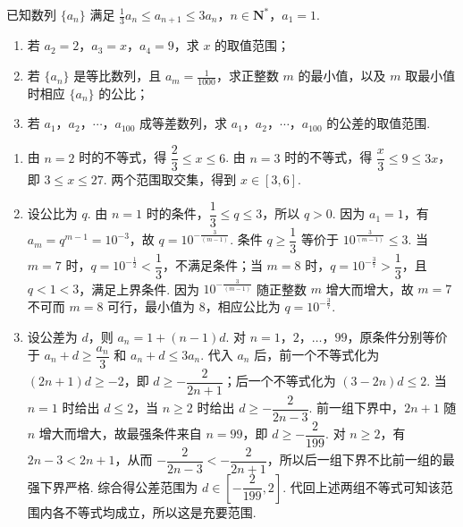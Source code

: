 \begin{problem}
已知数列 \(\{a_{n}\}\) 满足 \(\frac{1}{3} a_{n} \leqslant a_{n+1} \leqslant 3a_{n}\)，\(n \in \mathbf{N}^{*}\)，\(a_{1} = 1\).
\begin{enumerate}
\item 若 \(a_{2} = 2\)，\(a_{3} = x\)，\(a_{4} = 9\)，求 \(x\) 的取值范围；
\item 若 \(\{a_{n}\}\) 是等比数列，且 \(a_{m} = \frac{1}{1000}\)，求正整数 \(m\) 的最小值，以及 \(m\) 取最小值时相应 \(\{a_{n}\}\) 的公比；
\item 若 \(a_1\)，\(a_2\)，\(\cdots\)，\(a_{100}\) 成等差数列，求 \(a_1\)，\(a_2\)，\(\cdots\)，\(a_{100}\) 的公差的取值范围.
\end{enumerate}

\begin{solution}
\begin{enumerate}
\item 由 \(n=2\) 时的不等式，得 \(\dfrac23\leqslant x\leqslant6\). 由 \(n=3\) 时的不等式，得 \(\dfrac x3\leqslant9\leqslant3x\)，即 \(3\leqslant x\leqslant27\). 两个范围取交集，得到 \(x\in[3,6]\).
\item 设公比为 \(q\). 由 \(n=1\) 时的条件，\(\dfrac13\leqslant q\leqslant3\)，所以 \(q>0\). 因为 \(a_1=1\)，有 \(a_m=q^{m-1}=10^{-3}\)，故 \(q=10^{-\frac{3}{(m-1)}}\). 条件 \(q\geqslant\dfrac13\) 等价于 \(10^{\frac{3}{(m-1)}}\leqslant3\). 当 \(m=7\) 时，\(q=10^{-\frac{1}{2}}<\dfrac13\)，不满足条件；当 \(m=8\) 时，\(q=10^{-\frac{3}{7}}>\dfrac13\)，且 \(q<1<3\)，满足上界条件. 因为 \(10^{-\frac{3}{(m-1)}}\) 随正整数 \(m\) 增大而增大，故 \(m=7\) 不可而 \(m=8\) 可行，最小值为 \(8\)，相应公比为 \(q=10^{-\frac{3}{7}}\).
\item 设公差为 \(d\)，则 \(a_n=1+(n-1)d\). 对 \(n=1\)，\(2\)，\(\ldots\)，\(99\)，原条件分别等价于
\(a_n+d\geqslant\dfrac{a_n}{3}\) 和 \(a_n+d\leqslant3a_n\). 代入 \(a_n\) 后，前一个不等式化为 \((2n+1)d\geqslant-2\)，即 \(d\geqslant-\dfrac{2}{2n+1}\)；后一个不等式化为 \((3-2n)d\leqslant2\). 当 \(n=1\) 时给出 \(d\leqslant2\)，当 \(n\geqslant2\) 时给出 \(d\geqslant-\dfrac{2}{2n-3}\). 前一组下界中，\(2n+1\) 随 \(n\) 增大而增大，故最强条件来自 \(n=99\)，即 \(d\geqslant-\dfrac{2}{199}\). 对 \(n\geqslant2\)，有 \(2n-3<2n+1\)，从而 \(-\dfrac{2}{2n-3}< -\dfrac{2}{2n+1}\)，所以后一组下界不比前一组的最强下界严格. 综合得公差范围为 \(d\in\left[-\dfrac{2}{199},2\right]\). 代回上述两组不等式可知该范围内各不等式均成立，所以这是充要范围.
\end{enumerate}
\end{solution}
\end{problem}
